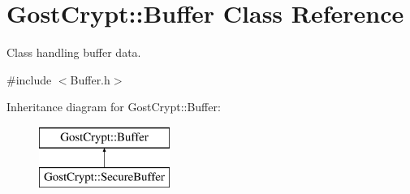 \hypertarget{class_gost_crypt_1_1_buffer}{}\section{Gost\+Crypt\+:\+:Buffer Class Reference}
\label{class_gost_crypt_1_1_buffer}


Class handling buffer data.  




{\ttfamily \#include $<$Buffer.\+h$>$}

Inheritance diagram for Gost\+Crypt\+:\+:Buffer\+:\begin{figure}[H]
\begin{center}
\leavevmode
\includegraphics[height=2.000000cm]{class_gost_crypt_1_1_buffer}
\end{center}
\end{figure}
